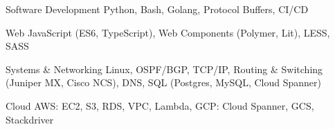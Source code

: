 

\begin{cvskills}

  \cvskill
    {Software Development} %
    {Python, Bash, Golang, Protocol Buffers, CI/CD} %

  \cvskill
    {Web} %
    {JavaScript (ES6, TypeScript), Web Components (Polymer, Lit), LESS, SASS} %

  \cvskill
    {Systems \& Networking} %
    {Linux, OSPF/BGP, TCP/IP, Routing \& Switching (Juniper MX, Cisco NCS), DNS, SQL (Postgres, MySQL, Cloud Spanner)} %


  \cvskill
    {Cloud} %
    {AWS: EC2, S3, RDS, VPC, Lambda, GCP: Cloud Spanner, GCS, Stackdriver} %

\end{cvskills}
